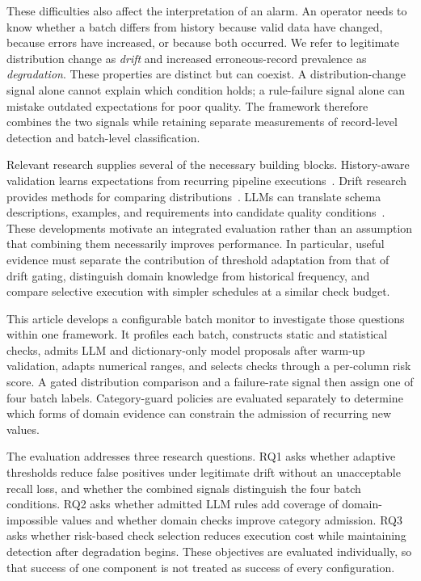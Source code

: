These difficulties also affect the interpretation of an alarm. An operator needs to know whether a batch differs from history because valid data have changed, because errors have increased, or because both occurred. We refer to legitimate distribution change as \emph{drift} and increased erroneous-record prevalence as \emph{degradation}. These properties are distinct but can coexist. A distribution-change signal alone cannot explain which condition holds; a rule-failure signal alone can mistake outdated expectations for poor quality. The framework therefore combines the two signals while retaining separate measurements of record-level detection and batch-level classification.

Relevant research supplies several of the necessary building blocks. History-aware validation learns expectations from recurring pipeline executions~\cite{Redyuk2021,Tu2023,Shankar2023}. Drift research provides methods for comparing distributions~\cite{Gama2014,Lu2019,Rabanser2019}. LLMs can translate schema descriptions, examples, and requirements into candidate quality conditions~\cite{Glock2026,Xie2025,Abughazala2026,Chen2026}. These developments motivate an integrated evaluation rather than an assumption that combining them necessarily improves performance. In particular, useful evidence must separate the contribution of threshold adaptation from that of drift gating, distinguish domain knowledge from historical frequency, and compare selective execution with simpler schedules at a similar check budget.

This article develops a configurable batch monitor to investigate those questions within one framework. It profiles each batch, constructs static and statistical checks, admits LLM and dictionary-only model proposals after warm-up validation, adapts numerical ranges, and selects checks through a per-column risk score. A gated distribution comparison and a failure-rate signal then assign one of four batch labels. Category-guard policies are evaluated separately to determine which forms of domain evidence can constrain the admission of recurring new values.

The evaluation addresses three research questions. RQ1 asks whether adaptive thresholds reduce false positives under legitimate drift without an unacceptable recall loss, and whether the combined signals distinguish the four batch conditions. RQ2 asks whether admitted LLM rules add coverage of domain-impossible values and whether domain checks improve category admission. RQ3 asks whether risk-based check selection reduces execution cost while maintaining detection after degradation begins. These objectives are evaluated individually, so that success of one component is not treated as success of every configuration.

